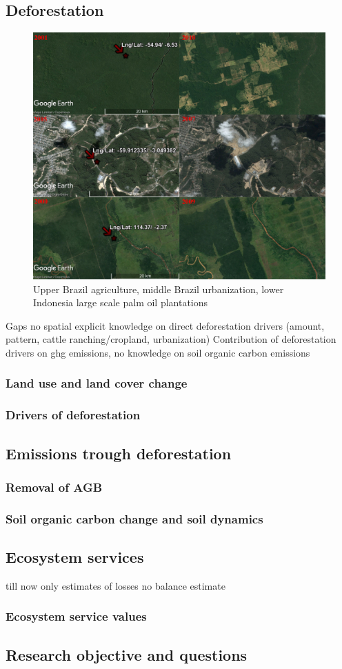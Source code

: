 \subsection{Deforestation}
	\begin{figure}[h]
		\centering
		\includegraphics[scale=0.6]{img/deforestation_examples}
		\caption[Deforestation examples]{Upper Brazil agriculture, middle Brazil urbanization, lower Indonesia large scale palm oil plantations}
		\label{fig:deforestationexamples}
	\end{figure}

	{\color{red} Gaps no spatial explicit knowledge on direct deforestation drivers (amount, pattern, cattle ranching/cropland, urbanization)}
	{\color{red} Contribution of deforestation drivers on ghg emissions, no knowledge on soil organic carbon emissions}
 
	\subsubsection{Land use and land cover change}
	\subsubsection{Drivers of deforestation}
	\subsection{Emissions trough deforestation}
	\subsubsection{Removal of AGB}
	\subsubsection{Soil organic carbon change and soil dynamics}

\subsection{Ecosystem services}
	{\color{red} till now only estimates of losses no balance estimate} 
	\subsubsection{Ecosystem service values}
	\subsection{Research objective and questions}
